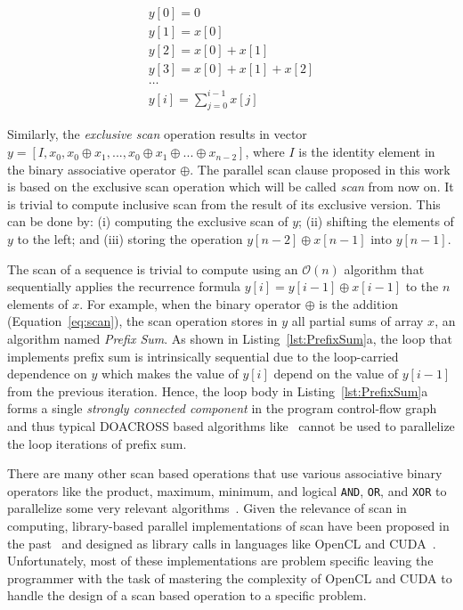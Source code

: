 \documentclass[Ingles]{ic-tese-v1}
\newcommand{\req}[1]{Equation~\ref{eq:#1}}
\newcommand{\rlsts}[2]{Listing~\ref{lst:#1}{#2}}
\begin{document}
\begin{eqnarray}
y[0] = 0\nonumber\\
y[1] = x[0] \nonumber\\
y[2] = x[0] + x[1] \nonumber\\
y[3] = x[0] + x[1] + x[2] \nonumber\\
\dots\nonumber\\
y[i] = \sum_{j=0}^{i-1} x[j]
\label{eq:scan}
\end{eqnarray}

Similarly,  the  {\em  exclusive  scan} operation  results  in  vector
$y =  [ I, x_{0}, x_{0}  \oplus x_{1}, ... ,x_{0}  \oplus x_{1} \oplus
... \oplus x_{n-2}]$, where $I$ is  the identity element in the binary
associative operator  $\oplus$. The  parallel scan clause  proposed in
this work  is based  on the  exclusive scan  operation which  will be
called \textit{scan} from now on.   It is trivial to compute inclusive
scan from  the result of its  exclusive version. This can  be done by:
(i) computing the exclusive scan of $y$; (ii) shifting the elements of
$y$    to    the   left;    and    (iii)    storing   the    operation
$y[n-2] \oplus x[n-1]$ into $y[n-1]$.

The scan of a sequence is trivial to compute using an $\mathcal{O}(n)$
algorithm   that   sequentially   applies   the   recurrence   formula
$y[i]  = y[i-1]  \oplus  x[i-1]$  to the  $n$  elements  of $x$.   For
example,   when  the   binary  operator   $\oplus$  is   the  addition
(\req{scan}), the  scan operation  stores in $y$  all partial  sums of
array  $x$,  an algorithm  named  \textit{Prefix  Sum}.  As  shown  in
\rlsts{PrefixSum}{a}, the  loop   that  implements   prefix  sum   is
intrinsically  sequential due  to the  loop-carried dependence  on $y$
which makes the  value of $y[i]$ depend on the  value of $y[i-1]$ from
the previous  iteration. Hence,  the loop body  in \rlsts{PrefixSum}{a}
forms a  single \textit{strongly  connected component} in  the program
control-flow  graph~\cite{flowgraph} and  thus typical  DOACROSS based
algorithms like~\cite{926166,344315} cannot  be used  to parallelize
the loop iterations of prefix sum.

There are many  other scan based operations that use various
associative  binary  operators  like the product,  maximum,  minimum,  and
logical  \texttt{AND}, \texttt{OR},  and  \texttt{XOR} to  parallelize
some                           very                           relevant
algorithms~\cite{NEEDLEMAN1970443,Crow:1984:STT:800031.808600,minimum}.
Given  the relevance  of  scan in  computing,  library-based  parallel
implementations    of    scan    have    been    proposed    in    the
past~\cite{dataparallel,  ScanAsPrimitive}  and  designed  as  library
calls   in  languages   like   OpenCL  and   CUDA~\cite{Sengupta:2007,
	Capannini:2011}.   Unfortunately, most  of these  implementations are
problem specific leaving the programmer with the task of mastering the
complexity of OpenCL and CUDA to handle the design of a scan
based operation to a specific problem.
\end{document}
